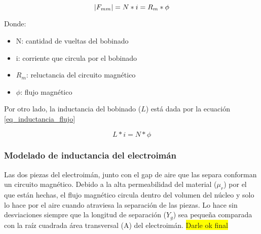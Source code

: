 



\begin{equation} \label{eq_fuerza-magnetomotriz}
	\lvert F_{mm}\rvert=N*i=R_{m}*\phi	
\end{equation}

\noindent Donde: 
\begin{itemize}
	\item N: cantidad de vueltas del bobinado
	\item i: corriente que circula por el bobinado
	\item $R_{m}$: reluctancia del circuito magnético
	\item $\phi$: flujo magnético
\end{itemize}


\noindent Por otro lado, la inductancia del bobinado ($L$) está dada por la ecuación \ref{eq_inductancia_flujo}

\begin{equation} \label{eq_inductancia_flujo}
	L*i=N*\phi
\end{equation}

\subsubsection{Modelado de inductancia del electroimán}

\noindent Las dos piezas del electroimán, junto con el gap de aire que las separa conforman un circuito magnético. Debido a la alta permeabilidad del material ($\mu_{r}$) por el que están hechas, el flujo magnético circula dentro del volumen del núcleo y solo lo hace por el aire cuando atraviesa la separación de las piezas. Lo hace sin desviaciones siempre que la longitud de separación ($Y_{g}$) sea pequeña comparada con la raíz cuadrada área transversal (A) del electroimán.
\colorbox{yellow}{Darle ok final}

